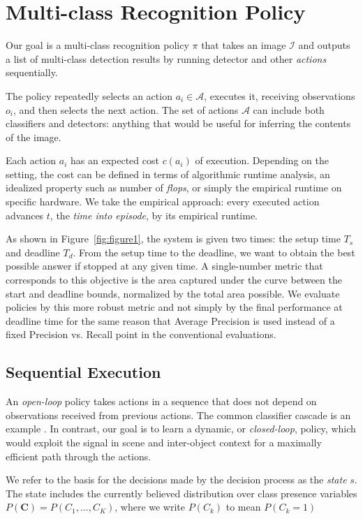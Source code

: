 \section{Multi-class Recognition Policy} \label{sec:tech}

Our goal is a multi-class recognition policy $\pi$ that takes an image $\mathcal{I}$ and outputs a list of multi-class detection results by running detector and other \emph{actions} sequentially.

The policy repeatedly selects an action $a_i \in \mathcal{A}$, executes it, receiving observations $o_i$, and then selects the next action.
The set of actions $\mathcal{A}$ can include both classifiers and detectors: anything that would be useful for inferring the contents of the image.

Each action $a_i$ has an expected cost $c(a_i)$ of execution.
Depending on the setting, the cost can be defined in terms of algorithmic runtime analysis, an idealized property such as number of \emph{flops}, or simply the empirical runtime on specific hardware.
We take the empirical approach: every executed action advances $t$, the \emph{time into episode}, by its empirical runtime.

As shown in Figure~\ref{fig:figure1}, the system is given two times: the setup time $T_s$ and deadline $T_d$.
From the setup time to the deadline, we want to obtain the best possible answer if stopped at any given time.
A single-number metric that corresponds to this objective is the area captured under the curve between the start and deadline bounds, normalized by the total area possible.
We evaluate policies by this more robust metric and not simply by the final performance at deadline time for the same reason that Average Precision is used instead of a fixed Precision vs. Recall point in the conventional evaluations.

\subsection{Sequential Execution}
An \emph{open-loop} policy takes actions in a sequence that does not depend on observations received from previous actions.
The common classifier cascade is an example \cite{Viola2001}.
In contrast, our goal is to learn a dynamic, or \emph{closed-loop}, policy, which would exploit the signal in scene and inter-object context for a maximally efficient path through the actions.

We refer to the basis for the decisions made by the decision process as the \emph{state} $s$.
The state includes the currently believed distribution over class presence variables $P(\mathbf{C}) = P(C_1, \dots, C_K)$, where we write $P(C_k)$ to mean $P(C_k=1)$


